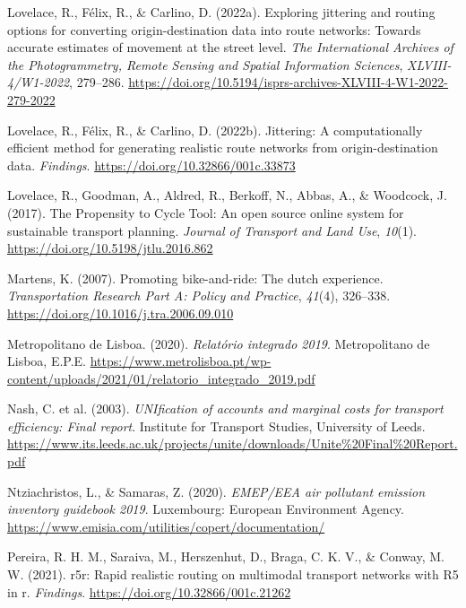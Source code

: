 \documentclass[review, doubleblind, 3p,
authoryear]{elsarticle} %
\newlength{\cslhangindent}
\newlength{\cslentryspacingunit} %
\newenvironment{CSLReferences}[2] %
 {%
  \setlength{\parindent}{0pt}
  \ifodd #1
  \let\oldpar\par
  \def\par{\hangindent=\cslhangindent\oldpar}
  \fi
  \setlength{\parskip}{#2\cslentryspacingunit}
 }%
 {}
\begin{document}
\begin{CSLReferences}{1}{0}
\leavevmode{}%
Lovelace, R., Félix, R., \& Carlino, D. (2022a). Exploring jittering and
routing options for converting origin-destination data into route
networks: Towards accurate estimates of movement at the street level.
\emph{The International Archives of the Photogrammetry, Remote Sensing
and Spatial Information Sciences}, \emph{XLVIII-4/W1-2022}, 279--286.
\url{https://doi.org/10.5194/isprs-archives-XLVIII-4-W1-2022-279-2022}

\leavevmode{}%
Lovelace, R., Félix, R., \& Carlino, D. (2022b). Jittering: A
computationally efficient method for generating realistic route networks
from origin-destination data. \emph{Findings}.
\url{https://doi.org/10.32866/001c.33873}

\leavevmode{}%
Lovelace, R., Goodman, A., Aldred, R., Berkoff, N., Abbas, A., \&
Woodcock, J. (2017). The Propensity to Cycle Tool: An open source online
system for sustainable transport planning. \emph{Journal of Transport
and Land Use}, \emph{10}(1). \url{https://doi.org/10.5198/jtlu.2016.862}

\leavevmode{}%
Martens, K. (2007). Promoting bike-and-ride: The dutch experience.
\emph{Transportation Research Part A: Policy and Practice},
\emph{41}(4), 326--338. \url{https://doi.org/10.1016/j.tra.2006.09.010}

\leavevmode{}%
Metropolitano de Lisboa. (2020). \emph{Relatório integrado 2019}.
{Metropolitano de Lisboa, E.P.E.}
\url{https://www.metrolisboa.pt/wp-content/uploads/2021/01/relatorio_integrado_2019.pdf}

\leavevmode{}%
Nash, C. et al. (2003). \emph{UNIfication of accounts and marginal costs
for transport efficiency: Final report}. {Institute for Transport
Studies, University of Leeds}.
\url{https://www.its.leeds.ac.uk/projects/unite/downloads/Unite\%20Final\%20Report.pdf}

\leavevmode{}%
Ntziachristos, L., \& Samaras, Z. (2020). \emph{{EMEP/EEA} air pollutant
emission inventory guidebook 2019}. Luxembourg: European Environment
Agency. \url{https://www.emisia.com/utilities/copert/documentation/}

\leavevmode{}%
Pereira, R. H. M., Saraiva, M., Herszenhut, D., Braga, C. K. V., \&
Conway, M. W. (2021). r5r: Rapid realistic routing on multimodal
transport networks with R5 in r. \emph{Findings}.
\url{https://doi.org/10.32866/001c.21262}


\end{CSLReferences}
\end{document}
